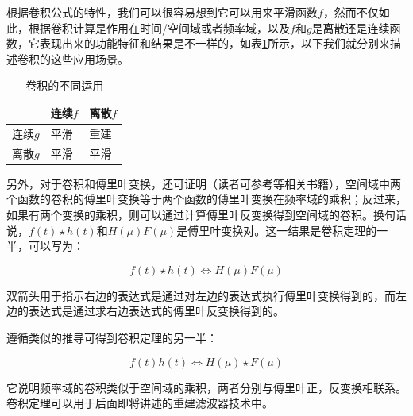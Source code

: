 根据卷积公式的特性，我们可以很容易想到它可以用来平滑函数$f$，然而不仅如此，根据卷积计算是作用在时间/空间域或者频率域，以及$f$和$g$是离散还是连续函数，它表现出来的功能特征和结果是不一样的，如表\ref{t:intro-conv-types}所示，以下我们就分别来描述卷积的这些应用场景。


\begin{table}
\caption{卷积的不同运用}
\label{t:intro-conv-types}
\centering
\begin{tabular}{p{}|p{}|p{}}
\hline 
   &连续$f$&离散$f$  \\
    \hline  
  连续$g$&平滑 & 重建\\
  离散$g$&平滑 & 平滑  \\

 \hline 
\end{tabular}
\end{table}

另外，对于卷积和傅里叶变换，还可证明（读者可参考\cite{b:DigitalImageProcessing}等相关书籍），空间域中两个函数的卷积的傅里叶变换等于两个函数的傅里叶变换在频率域的乘积；反过来，如果有两个变换的乘积，则可以通过计算傅里叶反变换得到空间域的卷积。换句话说，$f(t)\star h(t)$和$H(\mu)F(\mu)$是傅里叶变换对。这一结果是卷积定理的一半，可以写为：

\begin{equation}
	f(t)\star h(t)\Leftrightarrow H(\mu)F(\mu)
\end{equation}

双箭头用于指示右边的表达式是通过对左边的表达式执行傅里叶变换得到的，而左边的表达式是通过求右边表达式的傅里叶反变换得到的。

遵循类似的推导可得到卷积定理的另一半：

\begin{equation}
	f(t)h(t)\Leftrightarrow H(\mu)\star F(\mu)
\end{equation}

\noindent 它说明频率域的卷积类似于空间域的乘积，两者分别与傅里叶正，反变换相联系。卷积定理可以用于后面即将讲述的重建滤波器技术中。



